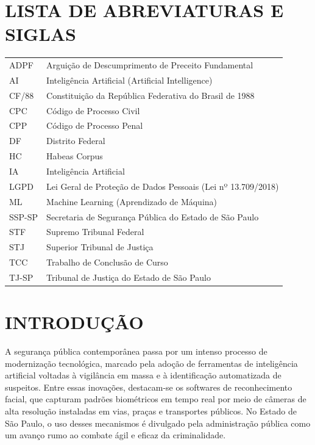 \documentclass[12pt,a4paper]{article}
\begin{document}
\section*{LISTA DE ABREVIATURAS E SIGLAS}

\begin{tabular}{ll}
ADPF & Arguição de Descumprimento de Preceito Fundamental \\
AI & Inteligência Artificial (Artificial Intelligence) \\
CF/88 & Constituição da República Federativa do Brasil de 1988 \\
CPC & Código de Processo Civil \\
CPP & Código de Processo Penal \\
DF & Distrito Federal \\
HC & Habeas Corpus \\
IA & Inteligência Artificial \\
LGPD & Lei Geral de Proteção de Dados Pessoais (Lei nº 13.709/2018) \\
ML & Machine Learning (Aprendizado de Máquina) \\
SSP-SP & Secretaria de Segurança Pública do Estado de São Paulo \\
STF & Supremo Tribunal Federal \\
STJ & Superior Tribunal de Justiça \\
TCC & Trabalho de Conclusão de Curso \\
TJ-SP & Tribunal de Justiça do Estado de São Paulo \\
\end{tabular}

\newpage

\tableofcontents
\newpage

\section{INTRODUÇÃO}

A segurança pública contemporânea passa por um intenso processo de modernização tecnológica, marcado pela adoção de ferramentas de inteligência artificial voltadas à vigilância em massa e à identificação automatizada de suspeitos. Entre essas inovações, destacam-se os softwares de reconhecimento facial, que capturam padrões biométricos em tempo real por meio de câmeras de alta resolução instaladas em vias, praças e transportes públicos. No Estado de São Paulo, o uso desses mecanismos é divulgado pela administração pública como um avanço rumo ao combate ágil e eficaz da criminalidade.
\end{document}
